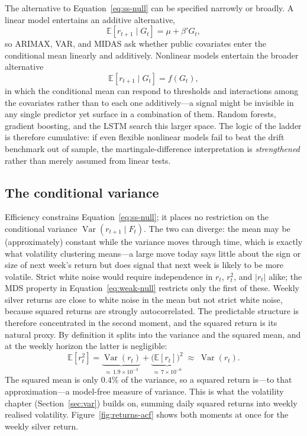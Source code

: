 \documentclass[12pt, a4paper]{article}
\newcommand{\E}{\mathbb{E}}
\begin{document}
The alternative to Equation~\eqref{eq:ss-null} can be specified narrowly or broadly. A
linear model entertains an additive alternative,
\begin{equation}
    \E[r_{t+1} \mid G_t] = \mu + \beta' G_t,
\end{equation}
so ARIMAX, VAR, and MIDAS ask whether public covariates enter the conditional mean
linearly and additively. Nonlinear models entertain the broader alternative
\begin{equation}
    \E[r_{t+1} \mid G_t] = f(G_t),
\end{equation}
in which the conditional mean can respond to thresholds and interactions among the
covariates rather than to each one additively---a signal might be invisible in any single
predictor yet surface in a combination of them. Random forests, gradient boosting, and the
LSTM search this larger space.
The logic of the ladder is therefore cumulative: if even flexible nonlinear models fail
to beat the drift benchmark out of sample, the martingale-difference interpretation is
\emph{strengthened} rather than merely assumed from linear tests.

\subsection{The conditional variance}
\label{sec:framework-var}

Efficiency constrains Equation~\eqref{eq:ss-null}; it places no restriction on the
conditional variance \(\operatorname{Var}(r_{t+1}\mid F_t)\). The two can diverge: the
mean may be (approximately) constant while the variance moves through time, which is
exactly what volatility clustering means---a large move today says little about the sign
or size of next week's return but does signal that next week is likely to be more
volatile. Strict white noise would require independence in \(r_t\), \(r_t^2\), and
\(|r_t|\) alike; the MDS property in Equation~\eqref{eq:weak-null} restricts only the
first of these. Weekly silver returns are close to white noise in the mean but not
strict white noise, because squared returns are strongly autocorrelated. The predictable
structure is therefore concentrated in the second moment, and the squared return is its
natural proxy. By definition it splits into the variance and the squared mean, and at the
weekly horizon the latter is negligible:
\begin{equation}
    \E[r_t^2]
    = \underbrace{\operatorname{Var}(r_t)}_{\approx\,1.9\times10^{-3}}
    + \underbrace{\big(\E[r_t]\big)^2}_{\approx\,7\times10^{-6}}
    \;\approx\; \operatorname{Var}(r_t).
    \label{eq:var-proxy}
\end{equation}
The squared mean is only \(0.4\%\) of the variance, so a squared return is---to that
approximation---a model-free measure of variance. This is what the volatility chapter
(Section~\ref{sec:var}) builds on, summing daily squared returns into weekly realised
volatility.
Figure~\ref{fig:returns-acf} shows both moments at once for the weekly silver return.
\end{document}
